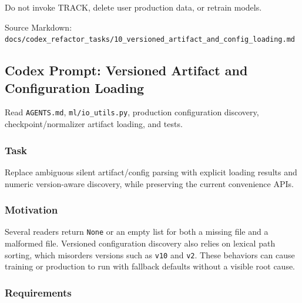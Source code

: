 \documentclass[
]{article}
\begin{document}
Do not invoke TRACK, delete user production data, or retrain models.

Source Markdown:
\texttt{docs/codex\_refactor\_tasks/10\_versioned\_artifact\_and\_config\_loading.md}

\hypertarget{codex-prompt-versioned-artifact-and-configuration-loading}{%
\subsection{Codex Prompt: Versioned Artifact and Configuration
Loading}\label{codex-prompt-versioned-artifact-and-configuration-loading}}

Read \texttt{AGENTS.md}, \texttt{ml/io\_utils.py}, production
configuration discovery, checkpoint/normalizer artifact loading, and
tests.

\hypertarget{task-9}{%
\subsubsection{Task}\label{task-9}}

Replace ambiguous silent artifact/config parsing with explicit loading
results and numeric version-aware discovery, while preserving the
current convenience APIs.

\hypertarget{motivation-3}{%
\subsubsection{Motivation}\label{motivation-3}}

Several readers return \texttt{None} or an empty list for both a missing
file and a malformed file. Versioned configuration discovery also relies
on lexical path sorting, which misorders versions such as \texttt{v10}
and \texttt{v2}. These behaviors can cause training or production to run
with fallback defaults without a visible root cause.

\hypertarget{requirements-9}{%
\subsubsection{Requirements}\label{requirements-9}}
\end{document}
